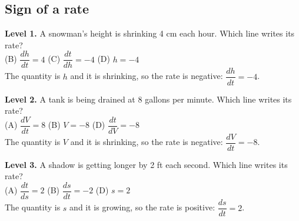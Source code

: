 \documentclass[11pt]{article}
\begin{document}
\subsection*{Sign of a rate}
\noindent\textbf{Level 1.} A snowman's height is shrinking 4 cm each hour. Which line writes its rate?\\  \quad (B) $\dfrac{dh}{dt}=4$ \quad (C) $\dfrac{dt}{dh}=-4$ \quad (D) $h=-4$\\  \quad The quantity is $h$ and it is shrinking, so the rate is negative: $\dfrac{dh}{dt}=-4$.\par\medskip
\noindent\textbf{Level 2.} A tank is being drained at 8 gallons per minute. Which line writes its rate?\\ (A) $\dfrac{dV}{dt}=8$ \quad (B) $V=-8$ \quad {} \quad (D) $\dfrac{dt}{dV}=-8$\\  \quad The quantity is $V$ and it is shrinking, so the rate is negative: $\dfrac{dV}{dt}=-8$.\par\medskip
\noindent\textbf{Level 3.} A shadow is getting longer by 2 ft each second. Which line writes its rate?\\ (A) $\dfrac{dt}{ds}=2$ \quad (B) $\dfrac{ds}{dt}=-2$ \quad {} \quad (D) $s=2$\\  \quad The quantity is $s$ and it is growing, so the rate is positive: $\dfrac{ds}{dt}=2$.\par\medskip
\end{document}
